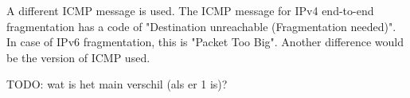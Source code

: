 A different ICMP message is used. The ICMP message for IPv4 end-to-end fragmentation has a code of "Destination unreachable (Fragmentation needed)". In case of IPv6 fragmentation, this is "Packet Too Big". Another difference would be the version of ICMP used.

TODO: wat is het main verschil (als er 1 is)?